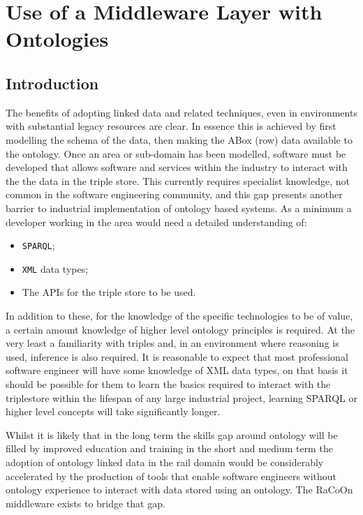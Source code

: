 \chapter{Use of a Middleware Layer with Ontologies}\label{ch:middleware}
\section{Introduction}\label{sec:mwintro}
The benefits of adopting linked data and related techniques, even in environments with substantial legacy resources are clear. In essence this is achieved by first modelling the schema of the data, then making the ABox (row) data available to the ontology. Once an area or sub-domain has been modelled, software must be developed that allows software and services within the industry to interact with the the data in the triple store. This currently requires specialist knowledge, not common in the software engineering community, and this gap presents another barrier to industrial implementation of ontology based systems. As a minimum a developer working in the area would need a detailed understanding of:
\begin{itemize}
    \item \texttt{SPARQL};
    \item \texttt{XML} data types;
    \item The APIs for the triple store to be used.
\end{itemize}

In addition to these, for the knowledge of the specific technologies to be of value, a certain amount knowledge of higher level ontology principles is required. At the very least a familiarity with triples and, in an environment where reasoning is used, inference is also required. It is reasonable to expect that most professional software engineer will have some knowledge of XML data types, on that basis it should be possible for them to learn the basics required to interact with the triplestore within the lifespan of any large industrial project, learning SPARQL or higher level concepts will take significantly longer.

Whilst it is likely that in the long term the skills gap around ontology will be filled by improved education and training in the short and medium term the adoption of ontology linked data in the rail domain would be considerably accelerated by the production of tools that enable software engineers without ontology experience to interact with data stored using an ontology. The RaCoOn middleware exists to bridge that gap.

